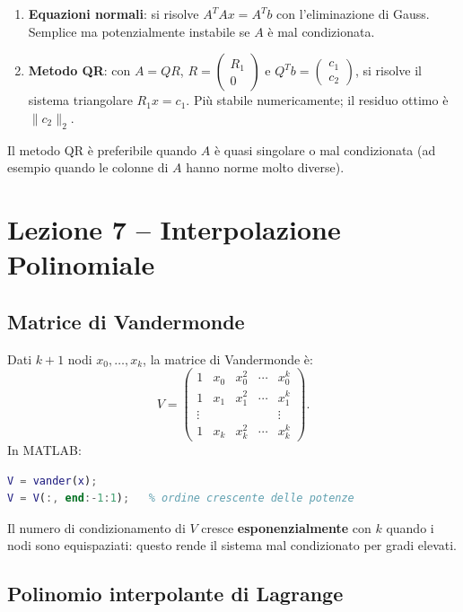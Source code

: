 \documentclass[12pt,a4paper,]{report}
\begin{document}
\begin{enumerate}
  \item \textbf{Equazioni normali}: si risolve $A^T A x = A^T b$ con
        l'eliminazione di Gauss. Semplice ma potenzialmente instabile se
        $A$ è mal condizionata.
  \item \textbf{Metodo QR}: con $A = QR$, $R = \begin{pmatrix}R_1 \\ 0\end{pmatrix}$
        e $Q^T b = \begin{pmatrix}c_1 \\ c_2\end{pmatrix}$, si risolve il
        sistema triangolare $R_1 x = c_1$. Più stabile numericamente;
        il residuo ottimo è $\|c_2\|_2$.
\end{enumerate}
Il metodo QR è preferibile quando $A$ è quasi singolare o mal condizionata
(ad esempio quando le colonne di $A$ hanno norme molto diverse).


\section{Lezione 7 -- Interpolazione Polinomiale}

\subsection{Matrice di Vandermonde}

Dati $k+1$ nodi $x_0, \ldots, x_k$, la matrice di Vandermonde è:
\[
  V = \begin{pmatrix}
    1 & x_0 & x_0^2 & \cdots & x_0^k \\
    1 & x_1 & x_1^2 & \cdots & x_1^k \\
    \vdots & & & & \vdots \\
    1 & x_k & x_k^2 & \cdots & x_k^k
  \end{pmatrix}.
\]
In MATLAB:
\begin{lstlisting}[language=Matlab]
V = vander(x);
V = V(:, end:-1:1);   % ordine crescente delle potenze
\end{lstlisting}
Il numero di condizionamento di $V$ cresce \textbf{esponenzialmente} con $k$
quando i nodi sono equispaziati: questo rende il sistema mal condizionato
per gradi elevati.

\subsection{Polinomio interpolante di Lagrange}
\end{document}
